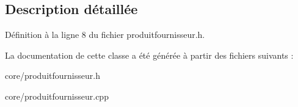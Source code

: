 \subsection{Description détaillée}


Définition à la ligne 8 du fichier produitfournisseur.h.



La documentation de cette classe a été générée à partir des fichiers suivants :\begin{DoxyCompactItemize}
\item 
core/produitfournisseur.h\item 
core/produitfournisseur.cpp\end{DoxyCompactItemize}
